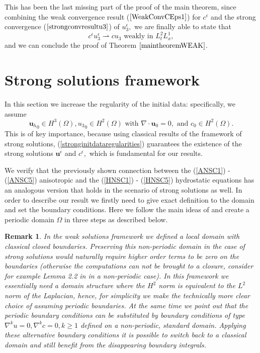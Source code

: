 \documentclass[11pt]{article}
\newtheorem{remark}{Remark}
\begin{document}
This has been the last missing part of the proof of the main theorem, since combining the weak convergence result ($\ref{WeakConvCEps1}$) for $c^\epsilon$ and the strong convergence ($\ref{strongconvresultu3}$) of $u_3^\epsilon,$ we are finally able to state that
%
\begin{equation}c^\epsilon u_3^\epsilon \rightharpoonup c u_3 \text{ weakly in } L_t^2 L_x^1,\end{equation}
%
and we can conclude the proof of Theorem $\ref{maintheoremWEAK}$.

\section{Strong solutions framework} \label{sectionSTRONGsol}

In this section we increase the regularity of the initial data: specifically, we assume \begin{equation}\label{stronginitdataregularities}{\mathbf{u}_h}_0 \in H^3(\Omega), {u_3}_0 \in H^2(\Omega) \text{ with } \nabla \cdot \mathbf{u}_0 = 0, \text{ and } c_0 \in H^2 (\Omega).\end{equation} This is of key importance, because using classical results of the framework of strong solutions, (\ref{stronginitdataregularities}) guarantees the existence of the strong solutions $\mathbf{u}^\epsilon$ and $c^\epsilon,$ which is fundamental for our results.

We verify that the previously shown connection between the (\ref{ANSC1}) - (\ref{ANSC5}) anisotropic and the (\ref{HNSC1}) - (\ref{HNSC5}) hydrostatic equations has an analogous version that holds in the scenario of strong solutions as well. In order to describe our result we firstly need to give exact definition to the domain and set the boundary conditions. Here we follow the main ideas of \cite{cao2014local} and create a periodic domain $\Omega$ in three steps as described below.

\begin{remark}
\normalfont In the weak solutions framework we defined a local domain with classical closed boundaries. Preserving this non-periodic domain in the case of strong solutions would naturally require higher order terms to be zero on the boundaries (otherwise the computations can not be brought to a closure, consider for example Lemma 2.2 in \cite{li2019primitive} in a non-periodic case). In this framework we essentially need a domain structure where the $H^2$ norm is equivalent to the $L^2$ norm of the Laplacian, hence, for simplicity we make the technically more clear choice of assuming periodic boundaries. At the same time we point out that the periodic boundary conditions can be substituted by boundary conditions of type $\nabla^k u = 0, \nabla^k c = 0, k \geq 1$ defined on a non-periodic, standard domain. Applying these alternative boundary conditions it is possible to switch back to a classical domain and still benefit from the disappearing boundary integrals.
\end{remark}
\end{document}

